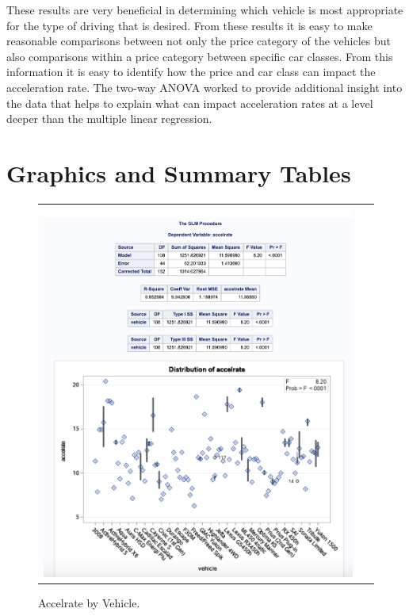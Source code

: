 \documentclass[acmsmall]{acmart}
\begin{document}
These results are very beneficial in determining which vehicle is most appropriate for the type of driving that is desired. From these results it is easy to make reasonable comparisons between not only the price category of the vehicles but also comparisons within a price category between specific car classes. From this information it is easy to identify how the price and car class can impact the acceleration rate. The two-way ANOVA worked to provide additional insight into the data that helps to explain what can impact acceleration rates at a level deeper than the multiple linear regression.

\pagebreak
\appendix{} 
\section{Graphics and Summary Tables}
\begin{figure}[H] %
	\centering
	\begin{tabular}{| p{}|}
	\hline
	\\
	\includegraphics[width=0.95\textwidth]{../graphics/AccelrateByVehicle}\\
	\hline
	\end{tabular}	
	\caption{Accelrate by Vehicle.} %
	\label{fig:ABV}
\end{figure}
\end{document}
